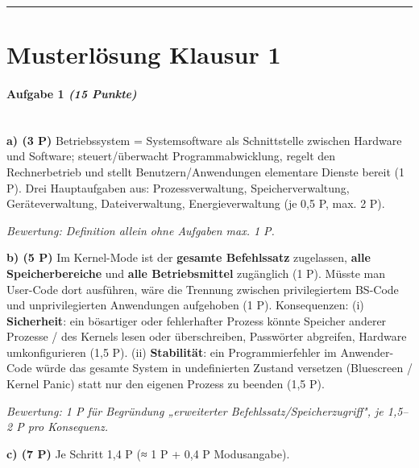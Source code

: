 \documentclass[11pt, a4paper]{article}
\begin{document}
\noindent\textcolor{rulegray}{\rule{\linewidth}{0.4pt}}



\section{Musterlösung Klausur 1}

\paragraph{Aufgabe 1 \textit{(15 Punkte)}}\mbox{}\\[2pt]

\textbf{a) (3 P)} Betriebssystem = Systemsoftware als Schnittstelle zwischen Hardware und Software; steuert/überwacht Programmabwicklung, regelt den Rechnerbetrieb und stellt Benutzern/Anwendungen elementare Dienste bereit (1 P). Drei Hauptaufgaben aus: Prozessverwaltung, Speicherverwaltung, Geräteverwaltung, Dateiverwaltung, Energieverwaltung (je 0,5 P, max. 2 P).

\textit{Bewertung: Definition allein ohne Aufgaben max. 1 P.}


\textbf{b) (5 P)} Im Kernel-Mode ist der \textbf{gesamte Befehlssatz} zugelassen, \textbf{alle Speicherbereiche} und \textbf{alle Betriebsmittel} zugänglich (1 P). Müsste man User-Code dort ausführen, wäre die Trennung zwischen privilegiertem BS-Code und unprivilegierten Anwendungen aufgehoben (1 P). Konsequenzen: (i) \textbf{Sicherheit}: ein bösartiger oder fehlerhafter Prozess könnte Speicher anderer Prozesse / des Kernels lesen oder überschreiben, Passwörter abgreifen, Hardware umkonfigurieren (1,5 P). (ii) \textbf{Stabilität}: ein Programmierfehler im Anwender-Code würde das gesamte System in undefinierten Zustand versetzen (Bluescreen / Kernel Panic) statt nur den eigenen Prozess zu beenden (1,5 P).

\textit{Bewertung: 1 P für Begründung „erweiterter Befehlssatz/Speicherzugriff", je 1,5–2 P pro Konsequenz.}


\textbf{c) (7 P)} Je Schritt 1,4 P (≈ 1 P + 0,4 P Modusangabe).
\end{document}
